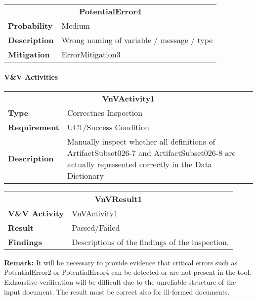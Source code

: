 \begin{tabular}{|lp{}|}
\hline
\multicolumn{2}{|c|}{\bf PotentialError4}\\
\bf Probability&Medium\\
\bf Description&Wrong naming of variable / message / type\\
\bf Mitigation&ErrorMitigation3\\
\hline
\end{tabular}

\paragraph{V\&V Activities}

\begin{tabular}{|lp{}|}
\hline
\multicolumn{2}{|c|}{\bf VnVActivity1}\\
\bf Type&Correctnes Inspection\\
\bf Requirement&UC1/Success Condition\\
\bf Description&Manually inspect whether all definitions of ArtifactSubset026-7 and ArtifactSubset026-8 are actually represented correctly in the Data Dictionary\\
\hline
\end{tabular}

\begin{tabular}{|lp{}|}
\hline
\multicolumn{2}{|c|}{\bf VnVResult1}\\
\bf V\&V Activity&VnVActivity1\\
\bf Result&Passed/Failed\\
\bf Findings&Descriptions of the findings of the inspection.\\
\hline
\end{tabular}


\textbf{Remark: } It will be necessary to provide evidence that critical errors such as PotentialError2 or PotentialError4 can be detected or are not present in the tool. 
                   Exhaustive verification will be difficult due to the unreliable structure of the input document. The result must be correct
                   also for ill-formed documents.

%
